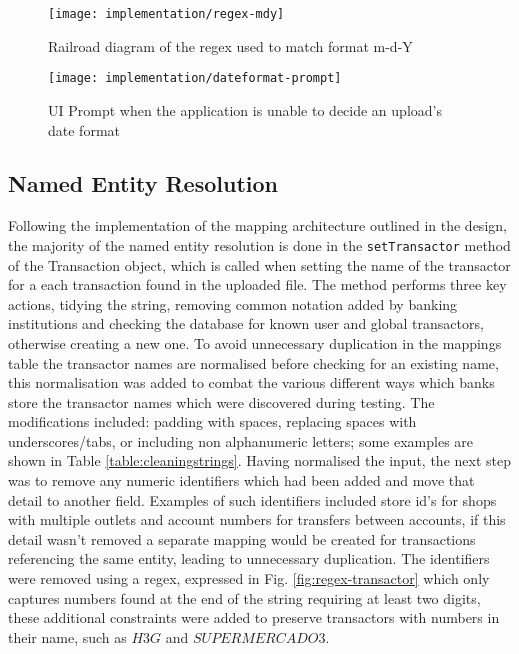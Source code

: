\begin{figure}[h]
    \centering
    \texttt{[image: implementation/regex-mdy]}
    \caption[Regular expression used to match m-d-Y]{Railroad diagram of the regex used to match format m-d-Y}
    \label{fig:regex-mdy}
\end{figure}

\begin{figure}[h]
    \centering
    \texttt{[image: implementation/dateformat-prompt]}
    \caption[UI Prompt asking for date format]{UI Prompt when the application is unable to decide an upload's date format}
    \label{fig:dateformat-prompt}
\end{figure}

\subsection{Named Entity Resolution}
Following the implementation of the mapping architecture outlined in the design, the majority of the named entity resolution is done in the \lstinline{setTransactor} method of the Transaction object, which is called when setting the name of the transactor for a each transaction found in the uploaded file.   
% 
The method performs three key actions, tidying the string, removing common notation added by banking institutions and checking the database for known user and global transactors, otherwise creating a new one.
% 
To avoid unnecessary duplication in the mappings table the \gls{transactor} names are normalised before checking for an existing name, this normalisation was added to combat the various different ways which banks store the transactor names which were discovered during testing. The modifications included: padding with spaces, replacing spaces with underscores/tabs, or including non alphanumeric letters; some examples are shown in Table \ref{table:cleaningstrings}.
%
Having normalised the input, the next step was to remove any numeric identifiers which had been added and move that detail to another field. Examples of such identifiers included store id's for shops with multiple outlets and account numbers for transfers between accounts, if this detail wasn't removed a separate mapping would be created for transactions referencing the same entity, leading to unnecessary duplication. The identifiers were removed using a regex, expressed in Fig. \ref{fig:regex-transactor} which only captures numbers found at the end of the string requiring at least two digits, these additional constraints were added to preserve \glspl{transactor} with numbers in their name, such as \inlinetext$H3G$ and \inlinetext$SUPERMERCADO 3$.
